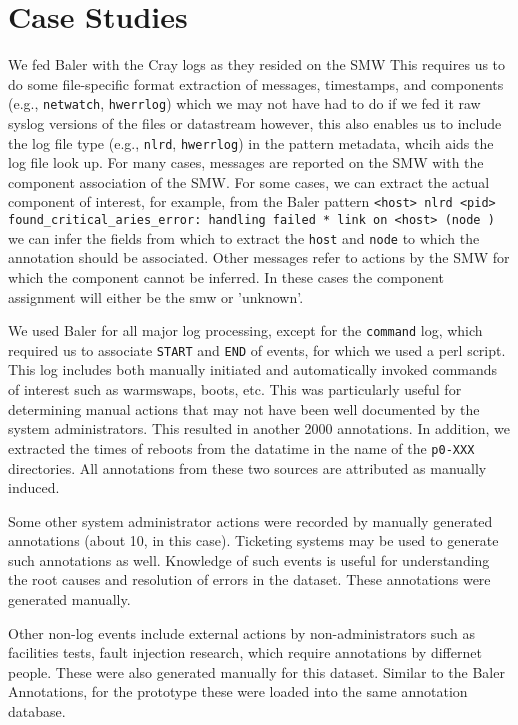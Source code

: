 \section{Case Studies}
\label{s:examples}

We fed Baler with the Cray logs as they resided on the SMW This requires us
to do some file-specific format extraction of messages, timestamps,
and components (e.g., \texttt{netwatch}, \texttt{hwerrlog}) which we may not have had to do if
we fed it raw syslog versions of the files or datastream however, this also enables us
to include the log file type (e.g., \texttt{nlrd}, \texttt{hwerrlog}) in the pattern metadata,
whcih aids the log file look up. For many cases, messages are reported
on the SMW with the component association of the SMW. For some cases, we can
extract the actual component of interest, for example, from the Baler pattern
\texttt{<host> nlrd <pid> found\_critical\_aries\_error: handling failed * link on <host> (node )}
we can infer the fields from which to extract the \texttt{host} and \texttt{node} to which
the annotation should be associated. Other messages refer to actions by the SMW for which
the component cannot be inferred. In these cases the component assignment will either be
the smw or 'unknown'.

We used Baler for all major log processing, except for the \texttt{command} log, which required us
to associate \texttt{START} and \texttt{END} of events, for which we used a perl script. This
log includes both manually initiated and automatically invoked commands of
interest such as warmswaps, boots, etc. This was particularly useful for
determining manual actions that may not have been well documented by the
system administrators. This resulted in another 2000 annotations. In addition,
we extracted the times of reboots from the datatime in the name of the \texttt{p0-XXX}
directories. All annotations from these two sources are attributed as manually induced.

Some other system administrator actions were recorded by manually generated annotations
(about 10, in this case). Ticketing systems may be used to generate such annotations as well.
Knowledge of such events is useful for understanding the root causes and resolution of errors
in the dataset. These annotations were generated manually.

Other non-log events include external actions by non-administrators
such as facilities tests, fault injection research, which require
annotations by differnet people. These were also generated manually
for this dataset. Similar to the Baler Annotations, for the
prototype these were loaded into the same annotation database.

